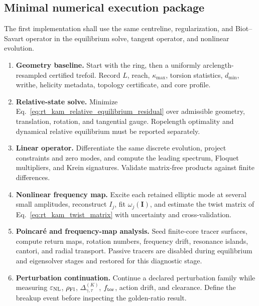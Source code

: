 \subsection{Minimal numerical execution package}
\label{subsec:rt_kam_numerical_package}

The first implementation shall use the same centreline, regularization, and
Biot--Savart operator in the equilibrium solve, tangent operator, and nonlinear
evolution.

\begin{enumerate}
    \item \textbf{Geometry baseline.}
    Start with the ring, then a uniformly arclength-resampled certified
    trefoil.  Record \(L\), reach, \(\kappa_{\max}\), torsion statistics,
    \(d_{\min}\), writhe, helicity metadata, topology certificate, and core
    profile.

    \item \textbf{Relative-state solve.}
    Minimize Eq.~\eqref{eq:rt_kam_relative_equilibrium_residual} over admissible
    geometry, translation, rotation, and tangential gauge.  Ropelength
    optimality and dynamical relative equilibrium must be reported separately.

    \item \textbf{Linear operator.}
    Differentiate the same discrete evolution, project constraints and zero
    modes, and compute the leading spectrum, Floquet multipliers, and Krein
    signatures.  Validate matrix-free products against finite differences.

    \item \textbf{Nonlinear frequency map.}
    Excite each retained elliptic mode at several small amplitudes, reconstruct
    \(I_j\), fit \(\omega_j(\mathbf I)\), and estimate the twist matrix of
    Eq.~\eqref{eq:rt_kam_twist_matrix} with uncertainty and cross-validation.

    \item \textbf{Poincar\'e and frequency-map analysis.}
    Seed finite-core tracer surfaces, compute return maps, rotation numbers,
    frequency drift, resonance islands, cantori, and radial transport.  Passive
    tracers are disabled during equilibrium and eigensolver stages and restored
    for this diagnostic stage.

    \item \textbf{Perturbation continuation.}
    Continue a declared perturbation family while measuring
    \(\varepsilon_{\rm NL}\), \(\rho_{\rm Fl}\),
    \(\Delta_{\gamma,\tau}^{(K)}\), \(f_{\rm tor}\), action drift, and
    clearance.  Define the breakup event before inspecting the golden-ratio
    result.


\end{enumerate}
